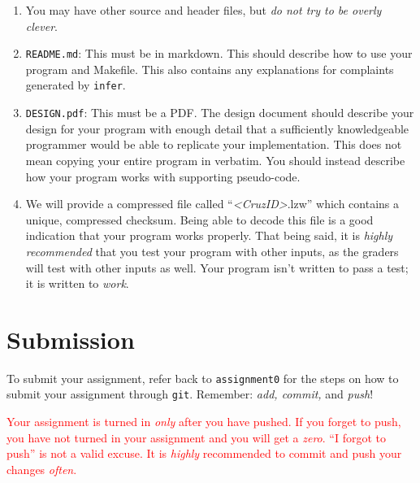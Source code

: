 \documentclass{article}
\begin{document}
\begin{enumerate}
    \item You may have other source and header files, but
        \emph{do not try to be overly clever}.
    \item \texttt{README.md}: This must be in markdown. This should
        describe how to use your program and Makefile. This also contains any
        explanations for complaints generated by \texttt{infer}.
    \item \texttt{DESIGN.pdf}: This must be a PDF. The design document should
        describe your design for your program with enough detail that a
        sufficiently knowledgeable programmer would be able to replicate your
        implementation. This does not mean copying your entire program in
        verbatim. You should instead describe how your program works with
        supporting pseudo-code.
    \item We will provide a compressed file called ``\emph{<CruzID>}.lzw'' which
        contains a unique, compressed checksum. Being able to decode this file
        is a good indication that your program works properly. That being said,
        it is \emph{highly recommended} that you test your program with other
        inputs, as the graders will test with other inputs as well. Your program
        isn't written to pass a test; it is written to \emph{work}.
\end{enumerate}


\section{Submission}

To submit your assignment, refer back to \texttt{assignment0} for the steps on
how to submit your assignment through \texttt{git}. Remember:
\emph{add, commit,} and \emph{push}!

\textcolor{red}{Your assignment is turned in \emph{only} after you have pushed.
If you forget to push, you have not turned in your assignment and you will get
a \emph{zero}. ``I forgot to push'' is not a valid excuse. It is \emph{highly}
recommended to commit and push your changes \emph{often}.}
\end{document}
